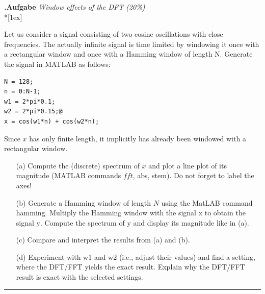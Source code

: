\documentclass[12pt,a4paper,austrian]{article}
\newcounter{theaufgabe}\setcounter{theaufgabe}{1}
\newenvironment{aufgabe}[1]%
{\bigskip\par\noindent\begin{nopagebreak}
                          \textsf{\textbf{\arabic{theaufgabe}.\thinspace Aufgabe}}\quad
                          \textsf{\textit{#1}}\\*[1ex]%
                          \stepcounter{theaufgabe}\hspace{2ex}
\end{nopagebreak}}
{\par\pagebreak[2]}
\begin{document}
    \begin{aufgabe}{Window effects of the DFT (20\%)}

        Let us consider a signal consisting of two cosine oscillations with close frequencies.
        The actually infinite signal is time limited by windowing it once with a rectangular window and once with a Hamming window of length N.
        Generate the signal in MATLAB as follows:

        \begin{lstlisting}[label={lst:ex5_lstlisting}]
N = 128;
n = 0:N-1;
w1 = 2*pi*0.1;
w2 = 2*pi*0.15;@
x = cos(w1*n) + cos(w2*n);
        \end{lstlisting}

        Since $x$ has only finite length, it implicitly has already been windowed with a rectangular window.
        \begin{enumerate}
            \item[(a)] Compute the (discrete) spectrum of $x$ and plot a line plot of its magnitude (MATLAB commands $f f t$, abs, stem). Do not forget to label the axes!

            \item[(b)] Generate a Hamming window of length $N$ using the MatLAB command hamming.
            Multiply the Hamming window with the signal $\mathrm{x}$ to obtain the signal $\mathrm{y}$.
            Compute the spectrum of $\mathrm{y}$ and display its magnitude like in (a).

            \item[(c)] Compare and interpret the results from (a) and (b).

            \item[(d)] Experiment with w1 and w2 (i.e., adjust their values) and find a setting, where the DFT/FFT yields the exact result.
            Explain why the DFT/FFT result is exact with the selected settings.
        \end{enumerate}
        \hrule

\begin{enumerate}
        
        
        
        
\end{enumerate}

    \end{aufgabe}
\end{document}
